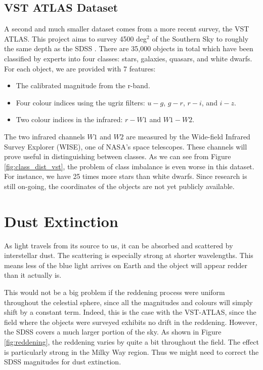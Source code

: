 \subsection{VST ATLAS Dataset} 
\label{sub:vstatlas}

A second and much smaller dataset comes from a more recent survey, the VST ATLAS. This project
aims to survey 4500 deg$^2$ of the Southern Sky to roughly the same depth as the SDSS
\cite{shanks15}.
There are 35,000 objects in total which have been classified by experts into four classes:
stars, galaxies, quasars, and white dwarfs. For each object, we are provided
with 7 features:
	\begin{itemize}
		\item The calibrated magnitude from the r-band.
		\item Four colour indices using the ugriz filters: $u-g$, $g-r$, $r-i$, and $i-z$.
		\item Two colour indices in the infrared: $r-W1$ and $W1-W2$.
	\end{itemize}
The two infrared channels $W1$ and $W2$ are measured by the Wide-field Infrared Survey Explorer
(WISE), one of NASA's space telescopes. These channels will prove useful in distinguishing
between classes. As we can see from Figure \ref{fig:class_dist_vst}, the problem of class
imbalance is even worse in this dataset. For instance, we have 25 times more stars than white
dwarfs. Since research is still on-going, the coordinates of the objects are not yet publicly
available.



\section{Dust Extinction} 
\label{sec:dust}

As light travels from its source to us, it can be absorbed and scattered by interstellar dust.
The scattering is especially strong at shorter wavelengths.
This means less of the blue light arrives on Earth and the object will appear redder than it actually
is.

This would not be a big problem if the reddening process were uniform throughout the
celestial sphere, since all the magnitudes and colours will simply shift by a constant
term. Indeed, this is the case with the VST-ATLAS, since the field where the objects were
surveyed exhibits no drift in the reddening.
However, the SDSS covers a much larger portion of the sky. As shown in
Figure \ref{fig:reddening}, the reddening varies by quite a bit throughout the field. The
effect is particularly strong in the Milky Way region. Thus we might need to correct the SDSS
magnitudes for dust extinction.

